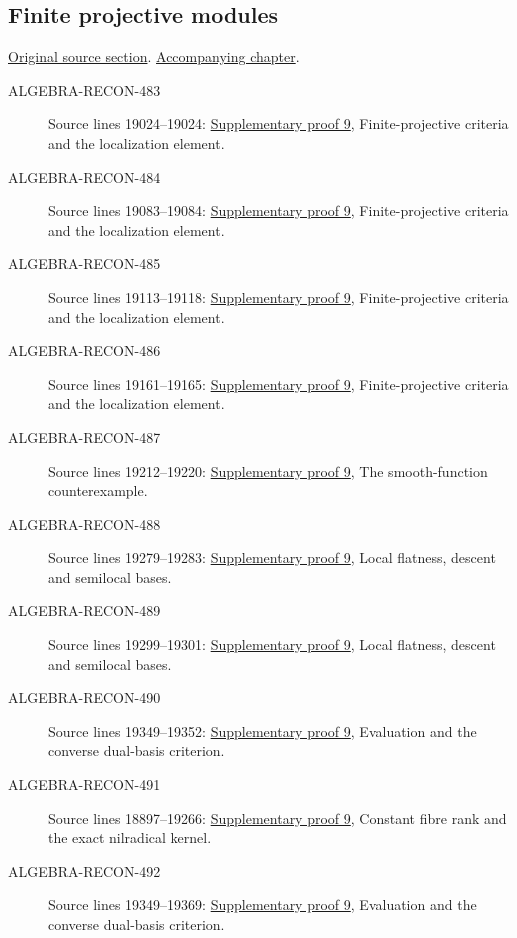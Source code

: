 \subsection{Finite projective modules}
\hypertarget{algebra-source-section-finite-projective-modules}{}
\noindent\href{https://github.com/stacks/stacks-project/blob/a04446e57ec1fbc252a871afcec7752fb2807b14/algebra.tex\#L19000}{Original source section}. \href{algebra.pdf\#nameddest=section-finite-projective-modules}{Accompanying chapter}.

\begin{description}
\item[ALGEBRA-RECON-483] Source lines 19024--19024: \hyperlink{algebra_projective_lifting_notes_20260927}{Supplementary proof 9}, Finite-projective criteria and the localization element.
\item[ALGEBRA-RECON-484] Source lines 19083--19084: \hyperlink{algebra_projective_lifting_notes_20260927}{Supplementary proof 9}, Finite-projective criteria and the localization element.
\item[ALGEBRA-RECON-485] Source lines 19113--19118: \hyperlink{algebra_projective_lifting_notes_20260927}{Supplementary proof 9}, Finite-projective criteria and the localization element.
\item[ALGEBRA-RECON-486] Source lines 19161--19165: \hyperlink{algebra_projective_lifting_notes_20260927}{Supplementary proof 9}, Finite-projective criteria and the localization element.
\item[ALGEBRA-RECON-487] Source lines 19212--19220: \hyperlink{algebra_projective_lifting_notes_20260927}{Supplementary proof 9}, The smooth-function counterexample.
\item[ALGEBRA-RECON-488] Source lines 19279--19283: \hyperlink{algebra_projective_lifting_notes_20260927}{Supplementary proof 9}, Local flatness, descent and semilocal bases.
\item[ALGEBRA-RECON-489] Source lines 19299--19301: \hyperlink{algebra_projective_lifting_notes_20260927}{Supplementary proof 9}, Local flatness, descent and semilocal bases.
\item[ALGEBRA-RECON-490] Source lines 19349--19352: \hyperlink{algebra_projective_lifting_notes_20260927}{Supplementary proof 9}, Evaluation and the converse dual-basis criterion.
\item[ALGEBRA-RECON-491] Source lines 18897--19266: \hyperlink{algebra_projective_lifting_notes_20260927}{Supplementary proof 9}, Constant fibre rank and the exact nilradical kernel.
\item[ALGEBRA-RECON-492] Source lines 19349--19369: \hyperlink{algebra_projective_lifting_notes_20260927}{Supplementary proof 9}, Evaluation and the converse dual-basis criterion.
\end{description}

